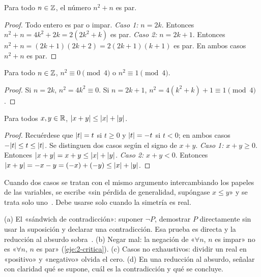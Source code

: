 \begin{proposicion}\label{prop:consecutivos}
Para todo $n\in\mathbb{Z}$, el número $n^{2}+n$ es par.
\end{proposicion}

\begin{proof}
Todo entero es par o impar. \emph{Caso 1:} $n=2k$. Entonces $n^{2}+n=4k^{2}+2k=2(2k^{2}+k)$ es par. \emph{Caso 2:} $n=2k+1$. Entonces $n^{2}+n=(2k+1)(2k+2)=2(2k+1)(k+1)$ es par. En ambos casos $n^{2}+n$ es par.
\end{proof}

\begin{proposicion}\label{prop:cuadrado-mod4}
Para todo $n\in\mathbb{Z}$, $n^{2}\equiv 0\pmod 4$ o $n^{2}\equiv 1\pmod 4$.
\end{proposicion}

\begin{proof}
Si $n=2k$, $n^{2}=4k^{2}\equiv 0$. Si $n=2k+1$, $n^{2}=4(k^{2}+k)+1\equiv 1\pmod 4$.
\end{proof}

\begin{teorema}\label{teo:triangular}
Para todos $x,y\in\mathbb{R}$, $\lvert x+y\rvert\le\lvert x\rvert+\lvert y\rvert$.
\end{teorema}

\begin{proof}
Recuérdese que $\lvert t\rvert=t$ si $t\ge 0$ y $\lvert t\rvert=-t$ si $t<0$; en ambos casos $-\lvert t\rvert\le t\le\lvert t\rvert$. Se distinguen dos casos según el signo de $x+y$.
\emph{Caso 1:} $x+y\ge 0$. Entonces $\lvert x+y\rvert=x+y\le\lvert x\rvert+\lvert y\rvert$.
\emph{Caso 2:} $x+y<0$. Entonces $\lvert x+y\rvert=-x-y=(-x)+(-y)\le\lvert x\rvert+\lvert y\rvert$.
\end{proof}

Cuando dos casos se tratan con el mismo argumento intercambiando los papeles de las variables, se escribe «sin pérdida de generalidad, supóngase $x\le y$» y se trata solo uno~\cite[§4.5]{hammack}. Debe usarse solo cuando la simetría es real.

\begin{observacion}\label{obs:4-errores}
(a) El «sándwich de contradicción»: suponer $\neg P$, demostrar $P$ directamente sin usar la suposición y declarar una contradicción. Esa prueba es directa y la reducción al absurdo sobra~\cite{cs103}.
(b) Negar mal: la negación de «$\forall n$, $n$ es impar» no es «$\forall n$, $n$ es par» (\cref{eje:2-critica}).
(c) Casos no exhaustivos: dividir un real en «positivo» y «negativo» olvida el cero.
(d) En una reducción al absurdo, señalar con claridad qué se supone, cuál es la contradicción y qué se concluye.
\end{observacion}

